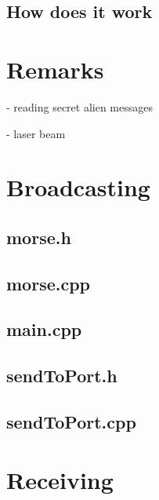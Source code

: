 \documentclass[12pt]{report}
\begin{document}
\section{How does it work}


\chapter{Remarks}

- reading secret alien messages

- laser beam




\newpage

\appendix

\chapter{Broadcasting}


\section{morse.h} \label{App:morse_h}







\newpage

\section{morse.cpp} \label{App:morse_cpp}

%

\newpage

\section{main.cpp} \label{App:main_cpp}



\newpage


\section{sendToPort.h} \label{App:sendToPort_h}


\newpage

\section{sendToPort.cpp} \label{App:sendToPort_cpp}




\chapter{Receiving}











\begin{thebibliography}{50}

\end{thebibliography}
\end{document}

